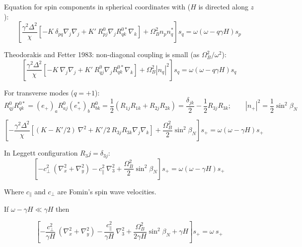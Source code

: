 \documentclass[a4paper]{article}
\begin{document}
Equation for spin components in spherical coordinates with
($H$ is directed along $z$):
$$
\left[
\frac{\gamma^2\Delta^2}{\chi}
  [-K\ \delta_{pq} \nabla_j\nabla_j
 + K'\ R^0_{pj}\nabla_j R^{0*}_{qk}\nabla_k]
+ \Omega_B^2 n_p n_q^*
\right] s_q =
\omega(\omega-q\gamma H) s_p
$$

Theodorakis and Fetter 1983: non-diagonal coupling is small
(as $\Omega_B^2/\omega^2$):
$$
\left[
\frac{\gamma^2\Delta^2}{\chi}
  [-K\ \nabla_j\nabla_j
 + K'\ R^0_{qj}\nabla_j R^{0*}_{qk}\nabla_k]
+ \Omega_B^2 |n_q|^2
\right] s_q =
\omega(\omega-q\gamma H) s_q
$$

For transverse modes ($q=+1$):
$$
R^0_{qj} R^{0*}_{qk}
= (e_{+})_a R^0_{aj} (e_{+}^*)_b R^{0}_{bk}
= \frac12 (R_{1j}R_{1k}+R_{2j}R_{2k})
= \frac{\delta_{jk}}{2}  - \frac12 R_{3j}R_{3k};
\qquad
|n_{+}|^2 = \frac12 \sin^2\beta_N
$$

$$
\left[ -
\frac{\gamma^2\Delta^2}{\chi}
  \left[(K-K'/2)\ \nabla^2
  + K'/2\ R_{3j}R_{3k} \nabla_j\nabla_k
  \right]
+ \frac{\Omega_B^2}{2} \sin^2\beta_N
\right] s_{+} =
\omega(\omega-\gamma H) s_{+}
$$

In Leggett configuration $R_3j = \delta_{3j}$:
$$
\left[
- {c_\perp^2}\ (\nabla_x^2+\nabla_y^2)
- {c_\parallel^2}\ \nabla_3^2
+ \frac{\Omega_B^2}{2} \sin^2\beta_N
\right] s_{+} =
\omega(\omega-\gamma H) s_{+}
$$

Where $c_\parallel$ and $c_\perp$ are Fomin's spin wave velocities.

If $\omega-\gamma H \ll \gamma H$ then

$$
\left[
- \frac{c_\perp^2}{\gamma H}\ (\nabla_x^2+\nabla_y^2)
- \frac{c_\parallel^2}{\gamma H}\ \nabla_3^2
+ \frac{\Omega_B^2}{2\gamma H} \sin^2\beta_N + \gamma H
\right] s_{+} =
\omega\ s_{+}
$$
\end{document}
